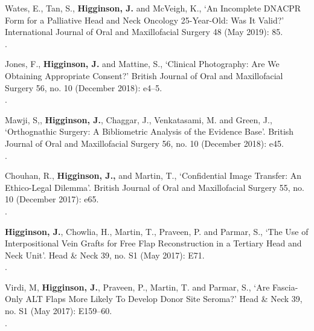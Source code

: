 \vspace{0.1cm}

 Wates, E., Tan, S., \textbf{Higginson, J.} and McVeigh, K., `An Incomplete DNACPR Form for a Palliative Head and Neck Oncology 25-Year-Old: Was It Valid?’ International Journal of Oral and Maxillofacial Surgery 48 (May 2019): 85. 
\\.

\vspace{0.1cm}

 Jones, F., \textbf{Higginson, J.} and Mattine, S., `Clinical Photography: Are We Obtaining Appropriate Consent?’ British Journal of Oral and Maxillofacial Surgery 56, no. 10 (December 2018): e4–5. 
\\.

\vspace{0.1cm}

 Mawji, S,, \textbf{Higginson, J.}, Chaggar, J.,  Venkatasami, M. and Green, J., `Orthognathic Surgery: A Bibliometric Analysis of the Evidence Base’. British Journal of Oral and Maxillofacial Surgery 56, no. 10 (December 2018): e45. 
\\.

\vspace{0.1cm}

 Chouhan, R., \textbf{Higginson, J.,} and Martin, T., `Confidential Image Transfer: An Ethico-Legal Dilemma’. British Journal of Oral and Maxillofacial Surgery 55, no. 10 (December 2017): e65.
\\.

\vspace{0.1cm}

 \textbf{Higginson, J.}, Chowlia, H., Martin, T., Praveen, P. and Parmar, S., `The Use of Interpositional Vein Grafts for Free Flap Reconstruction in a Tertiary Head and Neck Unit’. Head \& Neck 39, no. S1 (May 2017): E71. 
\\.

\vspace{0.1cm}

 Virdi, M, \textbf{Higginson, J.}, Praveen, P., Martin, T. and Parmar, S., `Are Fascia-Only ALT Flaps More Likely To Develop Donor Site Seroma?’ Head \& Neck 39, no. S1 (May 2017): E159–60. 
\\.

